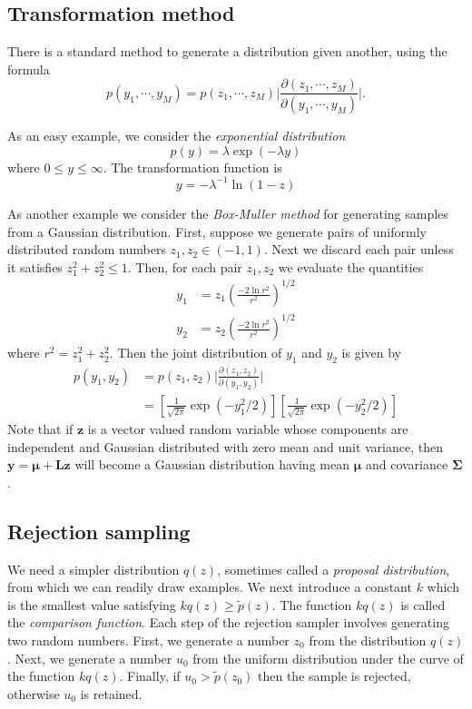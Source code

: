 \documentclass[a4paper]{report}
\renewcommand{\bf}{\mathbf}
\newcommand{\imp}[1]{{\color{blue}\textit{#1}}}
\newcommand{\bs}{\boldsymbol}
\begin{document}
\subsection{Transformation method}
There is a standard method to generate a distribution given another, using the formula
\begin{equation}
	p(y_1,\cdots,y_M) = p(z_1,\cdots,z_M) \bigg| \frac{\partial(z_1,\cdots,z_M)}{\partial (y_1,\cdots,y_M)}  \bigg|.
\end{equation}

As an easy example, we consider the \imp{exponential distribution}
\begin{equation}
	p(y) = \lambda \exp(-\lambda y)
\end{equation}
where $0 \leq y \leq \infty$. The transformation function is
\begin{equation}
	y = -\lambda ^{-1} \ln(1-z)
\end{equation}

As another example we consider the \imp{Box-Muller method} for generating samples from a Gaussian distribution. First, suppose we generate pairs of uniformly distributed random numbers $z_1,z_2 \in (-1,1)$. Next we discard each pair unless it satisfies $z_1^2 +z_2^2 \leq 1$. Then, for each pair $z_1,z_2$ we evaluate the quantities
\begin{align}
	y_1 &= z_1 \left( \frac{-2 \ln r^2}{r^2} \right)^{1/2} \\
	y_2 &= z_2 \left( \frac{-2 \ln r^2}{r^2} \right)^{1/2}
\end{align}
where $r^2 = z_1^2 + z_2^2$. Then the joint distribution of $y_1$ and $y_2$ is given by
\begin{align}
	p(y_1,y_2) &= p(z_1,z_2)\bigg| \frac{\partial(z_1,z_2)}{\partial(y_1,y_2)} \bigg| \\
	&= \left[ \frac{1}{\sqrt{2\pi}} \exp(-y_1^2/2) \right] \left[ \frac{1}{\sqrt{2\pi}} \exp(-y_2^2 /2)\right]
\end{align}
Note that if $\bf{z}$ is a vector valued random variable whose components are independent and Gaussian distributed with zero mean and unit variance, then $\bf{y} = \bs{\mu} + \bf{Lz}$ will become a Gaussian distribution having mean $\bs{\mu}$ and covariance $\bs{\Sigma}$.
\subsection{Rejection sampling}
We need a simpler distribution $q(z)$, sometimes called a \imp{proposal distribution}, from which we can readily draw examples. We next introduce a constant $k$ which is the smallest value satisfying $kq(z) \geq \tilde{p}(z)$. The function $kq(z)$ is called the \imp{comparison function}. Each step of the rejection sampler involves generating two random numbers. First, we generate a number $z_0$ from the distribution $q(z)$. Next, we generate a number $u_0$ from the uniform distribution under the curve of the function $kq(z)$. Finally, if $u_0 > \tilde{p}(z_0)$ then the sample is rejected, otherwise $u_0$ is retained.
\end{document}

